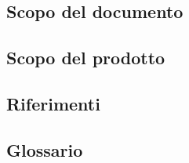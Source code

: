 \subsection{Scopo del documento}
\subsection{Scopo del prodotto}
\subsection{Riferimenti}
\subsection{Glossario}
